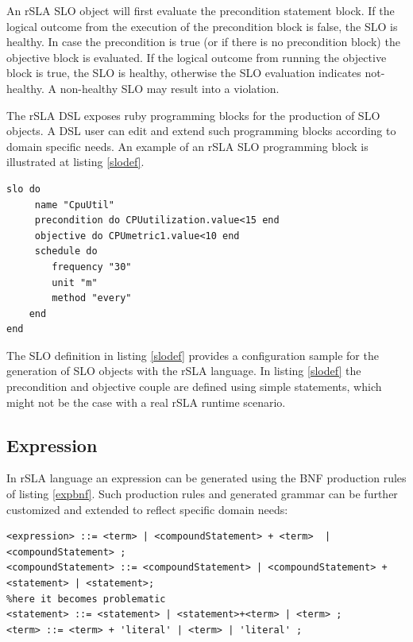 \documentclass{llncs}
\begin{document}
An rSLA SLO object will first evaluate the precondition statement block. If the logical outcome from the execution of the precondition block is false, the SLO is healthy. 
In case the precondition is true (or if there is no precondition block) the objective block is evaluated. If the logical outcome from running the objective block is true, the SLO is healthy, otherwise the SLO evaluation indicates not-healthy. A non-healthy SLO may result into a violation.

The rSLA DSL exposes ruby programming blocks for the production of SLO objects. A DSL user can edit and extend such programming blocks according to domain specific needs. An example of an rSLA SLO programming block is illustrated at listing \ref{slodef}.
\begin{lstlisting}[breaklines, firstnumber=auto, caption= rSLA SLO definition, label=slodef]
slo do
     name "CpuUtil"
     precondition do CPUutilization.value<15 end
     objective do CPUmetric1.value<10 end
     schedule do
      	frequency "30"
    	unit "m"
    	method "every"
    end
end	
\end{lstlisting}

The SLO definition in listing \ref{slodef} provides a configuration sample for the generation of SLO objects with the rSLA language. In listing \ref{slodef} the precondition and objective couple are defined using simple statements, which might not be the case with a real rSLA runtime scenario.


\subsection{Expression}\label{expression}

In rSLA language an expression can be generated using the BNF production rules of listing \ref{expbnf}. Such production rules and generated grammar can be further customized and extended to reflect specific domain needs:
\begin{lstlisting}[breaklines, firstnumber=auto, caption= $<Expression>$ BNF grammar, label=expbnf]
<expression> ::= <term> | <compoundStatement> + <term>  | <compoundStatement> ;
<compoundStatement> ::= <compoundStatement> | <compoundStatement> + <statement> | <statement>;
%here it becomes problematic
<statement> ::= <statement> | <statement>+<term> | <term> ;
<term> ::= <term> + 'literal' | <term> | 'literal' ;
\end{lstlisting}
\end{document}
